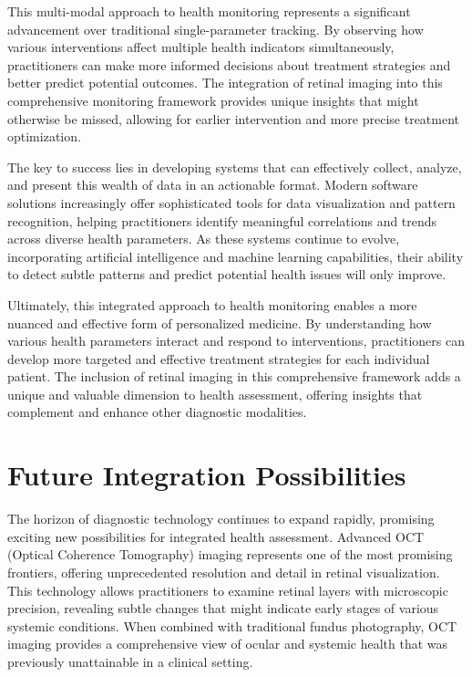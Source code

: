 \documentclass[
  Letterpaper,
]{scrbook}
\begin{document}
This multi-modal approach to health monitoring represents a significant
advancement over traditional single-parameter tracking. By observing how
various interventions affect multiple health indicators simultaneously,
practitioners can make more informed decisions about treatment
strategies and better predict potential outcomes. The integration of
retinal imaging into this comprehensive monitoring framework provides
unique insights that might otherwise be missed, allowing for earlier
intervention and more precise treatment optimization.

The key to success lies in developing systems that can effectively
collect, analyze, and present this wealth of data in an actionable
format. Modern software solutions increasingly offer sophisticated tools
for data visualization and pattern recognition, helping practitioners
identify meaningful correlations and trends across diverse health
parameters. As these systems continue to evolve, incorporating
artificial intelligence and machine learning capabilities, their ability
to detect subtle patterns and predict potential health issues will only
improve.

Ultimately, this integrated approach to health monitoring enables a more
nuanced and effective form of personalized medicine. By understanding
how various health parameters interact and respond to interventions,
practitioners can develop more targeted and effective treatment
strategies for each individual patient. The inclusion of retinal imaging
in this comprehensive framework adds a unique and valuable dimension to
health assessment, offering insights that complement and enhance other
diagnostic modalities.

\section{Future Integration
Possibilities}\label{future-integration-possibilities}

The horizon of diagnostic technology continues to expand rapidly,
promising exciting new possibilities for integrated health assessment.
Advanced OCT (Optical Coherence Tomography) imaging represents one of
the most promising frontiers, offering unprecedented resolution and
detail in retinal visualization. This technology allows practitioners to
examine retinal layers with microscopic precision, revealing subtle
changes that might indicate early stages of various systemic conditions.
When combined with traditional fundus photography, OCT imaging provides
a comprehensive view of ocular and systemic health that was previously
unattainable in a clinical setting.
\end{document}

